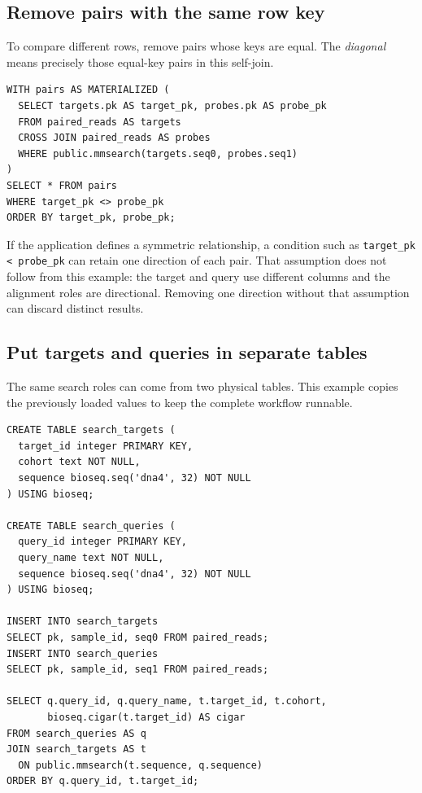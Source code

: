\subsection{Remove pairs with the same row key}

To compare different rows, remove pairs whose keys are equal. The
\emph{diagonal} means precisely those equal-key pairs in this self-join.

\par\noindent\begin{minipage}{\linewidth}
\begin{lstlisting}[style=bioseq-appendix-sql]
WITH pairs AS MATERIALIZED (
  SELECT targets.pk AS target_pk, probes.pk AS probe_pk
  FROM paired_reads AS targets
  CROSS JOIN paired_reads AS probes
  WHERE public.mmsearch(targets.seq0, probes.seq1)
)
SELECT * FROM pairs
WHERE target_pk <> probe_pk
ORDER BY target_pk, probe_pk;
\end{lstlisting}
\end{minipage}

If the application defines a symmetric relationship, a condition such as
\texttt{target\_pk < probe\_pk} can retain one direction of each pair.
That assumption does not follow from this example: the target and query
use different columns and the alignment roles are directional. Removing
one direction without that assumption can discard distinct results.

\subsection{Put targets and queries in separate tables}

The same search roles can come from two physical tables. This example
copies the previously loaded values to keep the complete workflow runnable.

\par\noindent\begin{minipage}{\linewidth}
\begin{lstlisting}[style=bioseq-appendix-sql]
CREATE TABLE search_targets (
  target_id integer PRIMARY KEY,
  cohort text NOT NULL,
  sequence bioseq.seq('dna4', 32) NOT NULL
) USING bioseq;

CREATE TABLE search_queries (
  query_id integer PRIMARY KEY,
  query_name text NOT NULL,
  sequence bioseq.seq('dna4', 32) NOT NULL
) USING bioseq;

INSERT INTO search_targets
SELECT pk, sample_id, seq0 FROM paired_reads;
INSERT INTO search_queries
SELECT pk, sample_id, seq1 FROM paired_reads;

SELECT q.query_id, q.query_name, t.target_id, t.cohort,
       bioseq.cigar(t.target_id) AS cigar
FROM search_queries AS q
JOIN search_targets AS t
  ON public.mmsearch(t.sequence, q.sequence)
ORDER BY q.query_id, t.target_id;
\end{lstlisting}
\end{minipage}

